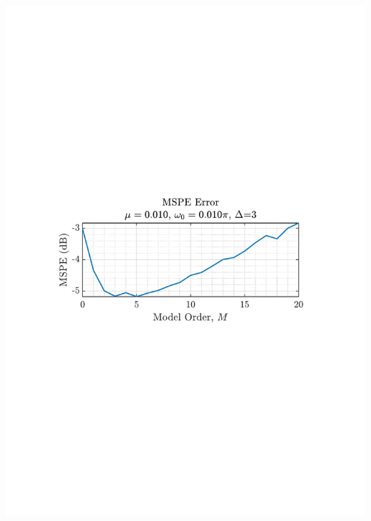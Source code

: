\documentclass[12pt]{article}
\begin{document}
\begin{minipage}{0.49\textwidth}
			\includegraphics[trim={2.2cm 11.2cm 3.15cm  11.2cm}, clip, width=\textwidth]{../MATLAB/figures/q2_3b_fig03.pdf} 
			\captionsetup{justification=centering}
			\label{fig: 2-3b}
		\end{minipage}%
		
\end{document}
